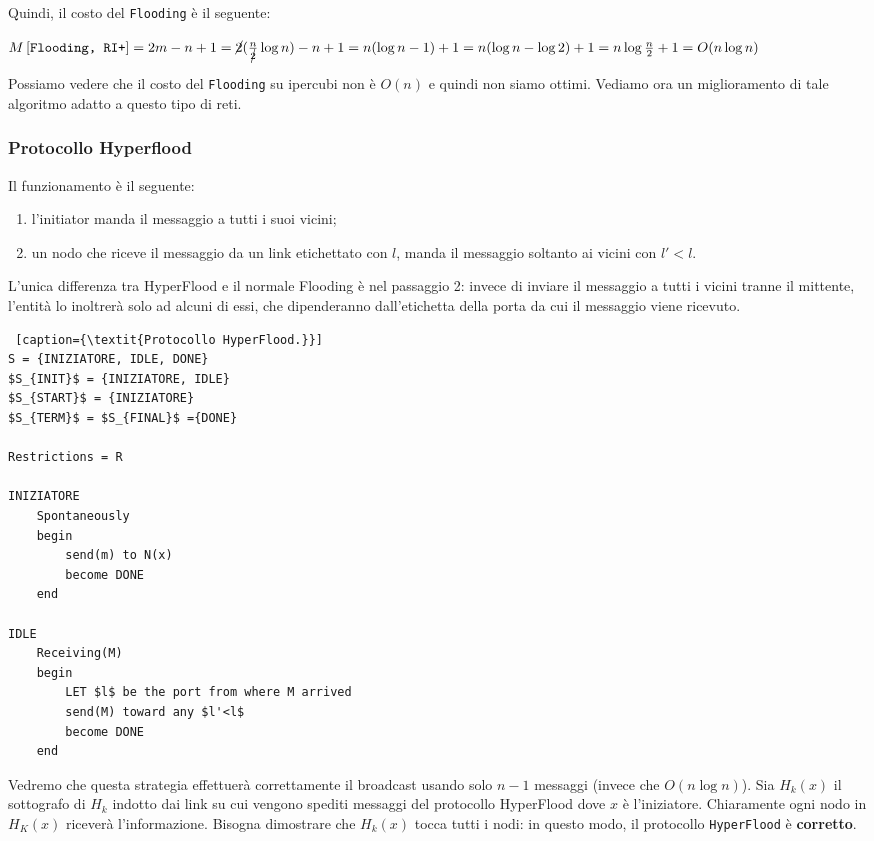 Quindi, il costo del \texttt{Flooding} è il seguente:

$M \left[ \texttt{Flooding, RI+} \right] = 2m-n+1 =
    \cancel{2}(\frac{n}{\cancel{2}} \log n)-n+1 = n(\log n -1) +1 = n(\log n -\log
    2) +1 = n\log{\frac{n}{2}}+1 = O(n \log n)$

Possiamo vedere che il costo del \texttt{Flooding} su ipercubi non è $O(n)$ e
quindi non siamo ottimi. Vediamo ora un miglioramento di tale algoritmo adatto a
questo tipo di reti.

\subsubsection{Protocollo Hyperflood}
Il funzionamento è il seguente:
\begin{enumerate}
    \item l'initiator manda il messaggio a tutti i suoi vicini;
    \item un nodo che riceve il messaggio da un link etichettato con $l$, manda il
          messaggio soltanto ai vicini con $l' < l$.
\end{enumerate}
L'unica differenza tra HyperFlood e il normale Flooding è nel passaggio 2:
invece di inviare il messaggio a tutti i vicini tranne il mittente, l'entità lo
inoltrerà solo ad alcuni di essi, che dipenderanno dall'etichetta della porta da
cui il messaggio viene ricevuto.

\begin{lstlisting} [caption={\textit{Protocollo HyperFlood.}}]
S = {INIZIATORE, IDLE, DONE}
$S_{INIT}$ = {INIZIATORE, IDLE}
$S_{START}$ = {INIZIATORE}
$S_{TERM}$ = $S_{FINAL}$ ={DONE}

Restrictions = R

INIZIATORE
    Spontaneously
    begin
        send(m) to N(x)
        become DONE
    end

IDLE
    Receiving(M)
    begin
        LET $l$ be the port from where M arrived
        send(M) toward any $l'<l$
        become DONE
    end
\end{lstlisting}

Vedremo che questa strategia effettuerà correttamente il broadcast usando solo
$n-1$ messaggi (invece che $O(n \log n)$). Sia $H_k(x)$ il sottografo di $H_k$
indotto dai link su cui vengono spediti messaggi del protocollo HyperFlood dove
$x$ è l'iniziatore. Chiaramente ogni nodo in $H_K(x)$ riceverà l'informazione.
Bisogna dimostrare che $H_k(x)$ tocca tutti i nodi: in questo modo, il
protocollo \texttt{HyperFlood} è \textbf{corretto}.

